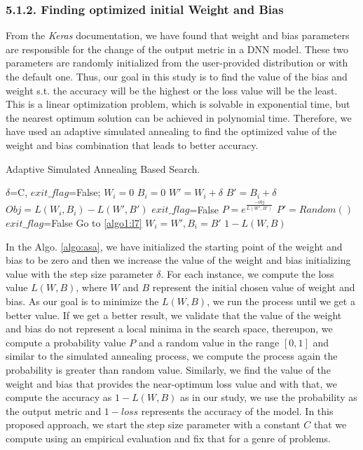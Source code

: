 \subsubsection{5.1.2. Finding optimized initial Weight and Bias}
From the \emph{Keras} documentation, we have found that weight and bias parameters are responsible for the change of the output metric in a DNN model. These two parameters are randomly initialized from the user-provided distribution or with the default one. Thus, our goal in this study is to find the value of the bias and weight s.t. the accuracy will be the highest or the loss value will be the least. This is a linear optimization problem, which is solvable in exponential time, but the nearest optimum solution can be achieved in polynomial time. Therefore, we have used an adaptive simulated annealing \cite{ingber2000adaptive} to find the optimized value of the weight and bias combination that leads to better accuracy. 
\begin{algorithm}[H]
	\footnotesize
	\caption{\footnotesize Adaptive Simulated Annealing Based Search.}
	\label{algo:asa}
	\begin{algorithmic}[1]
		\State $\delta$=C, $exit\_flag$=False;
		\label{algo1:l3}
		\State $W_i=0$\label{algo1:l4}
		\State $B_i=0$\label{algo1:l5}
		\label{algo1:l7}
		\State $W'=W_i+\delta$
		\State $B'=B_i+\delta$
		\State $Obj=L(W_i,B_i)-L(W',B')$
		\State $exit\_flag$=False
		\Else
		\State $P=e^{\frac{-obj}{L(W',B')}}$
		\State $P'=Random()$
		\State  $exit\_flag$=False
		\EndIf
		\EndIf
		\Else
		\State Go to \ref{algo1:l7}
		\EndIf
		\EndWhile
		\State $W_i=W', B_i=B'$
		\EndFor\label{algo1:l6}
		\State \Return $1-L(W,B)$\label{algo2:l12}
		\EndProcedure\label{algo2:l13}
	\end{algorithmic} 
\end{algorithm}
In the Algo. \ref{algo:asa}, we have initialized the starting point of the weight and bias to be zero and then we increase the value of the weight and bias initializing value with the step size parameter $\delta$. For each instance, we compute the loss value $L(W, B)$, where $W$ and $B$ represent the initial chosen value of weight and bias. As our goal is to minimize the $L(W, B)$, we run the process until we get a better value. If we get a better result, we validate that the value of the weight and bias do not represent a local minima in the search space, thereupon, we compute a probability value $P$ and a random value in the range $[0,1]$ and similar to the simulated annealing process, we compute the process again the probability is greater than random value. Similarly, we find the value of the weight and bias that provides the near-optimum loss value and with that, we compute the accuracy as $1-L(W, B)$ as in our study, we use the probability as the output metric and $1-loss$ represents the accuracy of the model. In this proposed approach, we start the step size parameter with a constant $C$ that we compute using an empirical evaluation and fix that for a genre of problems.
